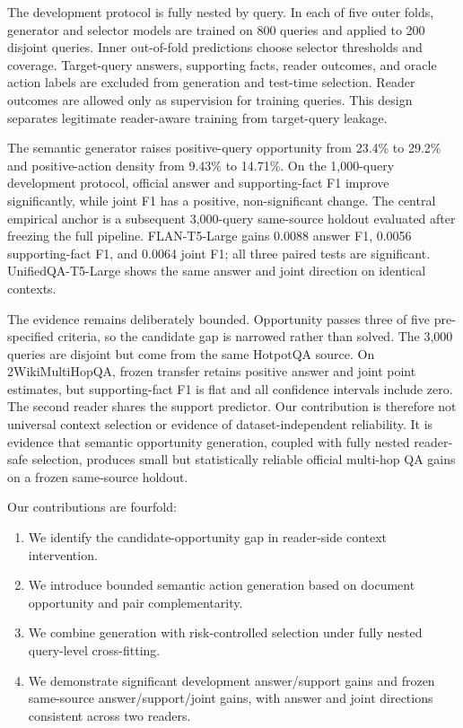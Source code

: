 The development protocol is fully nested by query. In each of five outer folds, generator and selector models are trained on 800 queries and applied to 200 disjoint queries. Inner out-of-fold predictions choose selector thresholds and coverage. Target-query answers, supporting facts, reader outcomes, and oracle action labels are excluded from generation and test-time selection. Reader outcomes are allowed only as supervision for training queries. This design separates legitimate reader-aware training from target-query leakage.

The semantic generator raises positive-query opportunity from 23.4\% to 29.2\% and positive-action density from 9.43\% to 14.71\%. On the 1,000-query development protocol, official answer and supporting-fact F1 improve significantly, while joint F1 has a positive, non-significant change. The central empirical anchor is a subsequent 3,000-query same-source holdout evaluated after freezing the full pipeline. FLAN-T5-Large gains 0.0088 answer F1, 0.0056 supporting-fact F1, and 0.0064 joint F1; all three paired tests are significant. UnifiedQA-T5-Large shows the same answer and joint direction on identical contexts.

The evidence remains deliberately bounded. Opportunity passes three of five pre-specified criteria, so the candidate gap is narrowed rather than solved. The 3,000 queries are disjoint but come from the same HotpotQA source. On 2WikiMultiHopQA, frozen transfer retains positive answer and joint point estimates, but supporting-fact F1 is flat and all confidence intervals include zero. The second reader shares the support predictor. Our contribution is therefore not universal context selection or evidence of dataset-independent reliability. It is evidence that semantic opportunity generation, coupled with fully nested reader-safe selection, produces small but statistically reliable official multi-hop QA gains on a frozen same-source holdout.

Our contributions are fourfold:

\begin{enumerate}
\item We identify the candidate-opportunity gap in reader-side context intervention.
\item We introduce bounded semantic action generation based on document opportunity and pair complementarity.
\item We combine generation with risk-controlled selection under fully nested query-level cross-fitting.
\item We demonstrate significant development answer/support gains and frozen same-source answer/support/joint gains, with answer and joint directions consistent across two readers.
\end{enumerate}

